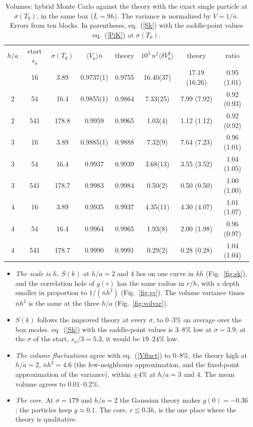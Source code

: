 \documentclass[11pt,aps,preprint,nofootinbib,superscriptaddress,tightenlines]{revtex4-2}
\newcommand{\avg}[1]{\langle #1\rangle}
\def\Eq#1{eq.~(\ref{#1})}
\def\Fig#1{Fig.~\ref{#1}}
\begin{document}
\begin{table}[h]
\caption{Volumes: hybrid Monte Carlo against the theory with the exact single particle at $\sigma(T_0)$, in the same box ($L=9h$).  The variance is normalized by
$V=1/\bar n$.  Errors from ten blocks.  In parentheses, \Eq{Sk} with the saddle-point values \Eq{PiK} at $\sigma(T_0)$.}
\label{tab:hmc}
\begin{ruledtabular}
\begin{tabular}{ccc cc ccc}
$h/a$ & start $s_a$ & $\sigma(T_0)$ & $\avg{V_a}\bar n$ & theory & $10^3\,\bar n^2\avg{\delta V_a^2}$ & theory & ratio \\
\colrule
2 & 16  & 3.89  & 0.9737(1) & 0.9755 & 16.40(37) & 17.19 (16.26) & 0.95 (1.01) \\
2 & 54  & 16.4  & 0.9855(1) & 0.9864 & 7.33(25)  & 7.99 (7.92)   & 0.92 (0.93) \\
2 & 541 & 178.8 & 0.9959    & 0.9965 & 1.03(4)   & 1.12 (1.12)   & 0.92 (0.92) \\
3 & 16  & 3.89  & 0.9885(1) & 0.9888 & 7.32(9)   & 7.64 (7.23)   & 0.96 (1.01) \\
3 & 54  & 16.4  & 0.9937    & 0.9939 & 3.68(13)  & 3.55 (3.52)   & 1.04 (1.05) \\
3 & 541 & 178.7 & 0.9983    & 0.9984 & 0.50(2)   & 0.50 (0.50)   & 1.00 (1.00) \\
4 & 16  & 3.89  & 0.9935    & 0.9937 & 4.35(11)  & 4.30 (4.07)   & 1.01 (1.07) \\
4 & 54  & 16.4  & 0.9964    & 0.9965 & 1.93(8)   & 2.00 (1.98)   & 0.96 (0.97) \\
4 & 541 & 178.7 & 0.9990    & 0.9991 & 0.29(2)   & 0.28 (0.28)   & 1.04 (1.04) \\
\end{tabular}
\end{ruledtabular}
\end{table}

\begin{itemize}
\item \emph{The scale is $h$.}  $S(k)$ at $h/a=2$ and $4$ lies on one curve in $kh$ (\Fig{fig:sk}), and the correlation hole of $g(r)$ has the
  same radius in $r/h$, with a depth smaller in proportion to $1/(\bar nh^2)$ (\Fig{fig:gr}).  The volume variance times $\bar nh^2$ is the same at the
  three $h/a$ (\Fig{fig:volvar}).
\item \emph{$S(k)$} follows the improved theory at every $\sigma$, to $0$--$3\%$ on average over the box modes.  \Eq{Sk} with the saddle-point values is $3$--$8\%$
  low at $\sigma=3.9$; at the $\sigma$ of the start, $s_a/3=5.3$, it would be $19$--$24\%$ low.
\item \emph{The volume fluctuations} agree with \Eq{Vfluct} to $0$--$8\%$, the theory high at $h/a=2$, $\bar nh^2=4.6$ (the few-neighbours approximation, and
  the fixed-point approximation of the variance), within $\pm4\%$ at $h/a=3$ and $4$.  The mean volume agrees to $0.01$--$0.2\%$.
\item \emph{The core.}  At $\sigma=179$ and $h/a=2$ the Gaussian theory makes $g(0)=-0.36$; the particles keep $g\approx0.1$.  The core, $r\lesssim0.3h$, is the one
  place where the theory is qualitative.
\end{itemize}
\end{document}

